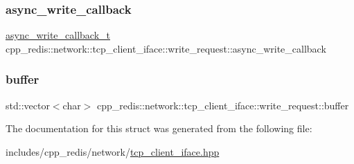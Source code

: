 \subsubsection{\texorpdfstring{async\+\_\+write\+\_\+callback}{async\_write\_callback}}
{\footnotesize\ttfamily \hyperlink{classcpp__redis_1_1network_1_1tcp__client__iface_a1dc52ccc70cf377c4fbb495a16adc658}{async\+\_\+write\+\_\+callback\+\_\+t} cpp\+\_\+redis\+::network\+::tcp\+\_\+client\+\_\+iface\+::write\+\_\+request\+::async\+\_\+write\+\_\+callback}

\mbox{\label{structcpp__redis_1_1network_1_1tcp__client__iface_1_1write__request_ad3567dac827f550b60491af530f0db2e}} 
\subsubsection{\texorpdfstring{buffer}{buffer}}
{\footnotesize\ttfamily std\+::vector$<$char$>$ cpp\+\_\+redis\+::network\+::tcp\+\_\+client\+\_\+iface\+::write\+\_\+request\+::buffer}



The documentation for this struct was generated from the following file\+:\begin{DoxyCompactItemize}
\item 
includes/cpp\+\_\+redis/network/\hyperlink{tcp__client__iface_8hpp}{tcp\+\_\+client\+\_\+iface.\+hpp}\end{DoxyCompactItemize}
